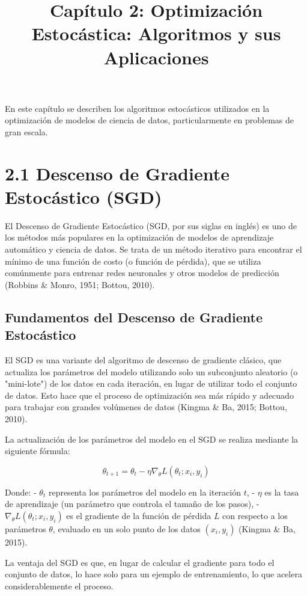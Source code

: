 \documentclass[12pt]{article}
\title{\textbf{Capítulo 2: Optimización Estocástica: Algoritmos y sus Aplicaciones}}
\author{}
\date{}
\begin{document}
	
	\maketitle
	En este capítulo se describen los algoritmos estocásticos utilizados en la optimización de modelos de ciencia de datos, particularmente en problemas de gran escala.
	
	\section*{2.1 Descenso de Gradiente Estocástico (SGD)}
	
	El Descenso de Gradiente Estocástico (SGD, por sus siglas en inglés) es uno de los métodos más populares en la optimización de modelos de aprendizaje automático y ciencia de datos. Se trata de un método iterativo para encontrar el mínimo de una función de costo (o función de pérdida), que se utiliza comúnmente para entrenar redes neuronales y otros modelos de predicción (Robbins \& Monro, 1951; Bottou, 2010).
	
	\subsection*{Fundamentos del Descenso de Gradiente Estocástico}
	
	El SGD es una variante del algoritmo de descenso de gradiente clásico, que actualiza los parámetros del modelo utilizando solo un subconjunto aleatorio (o "mini-lote") de los datos en cada iteración, en lugar de utilizar todo el conjunto de datos. Esto hace que el proceso de optimización sea más rápido y adecuado para trabajar con grandes volúmenes de datos (Kingma \& Ba, 2015; Bottou, 2010).
	
	La actualización de los parámetros del modelo en el SGD se realiza mediante la siguiente fórmula:
	
	\[
	\theta_{t+1} = \theta_t - \eta \nabla_{\theta} L(\theta_t; x_i, y_i)
	\]
	
	Donde:
	- \( \theta_t \) representa los parámetros del modelo en la iteración \( t \),
	- \( \eta \) es la tasa de aprendizaje (un parámetro que controla el tamaño de los pasos),
	- \( \nabla_{\theta} L(\theta_t; x_i, y_i) \) es el gradiente de la función de pérdida \( L \) con respecto a los parámetros \( \theta \), evaluado en un solo punto de los datos \( (x_i, y_i) \) (Kingma \& Ba, 2015).
	
	La ventaja del SGD es que, en lugar de calcular el gradiente para todo el conjunto de datos, lo hace solo para un ejemplo de entrenamiento, lo que acelera considerablemente el proceso.
	
\end{document}
